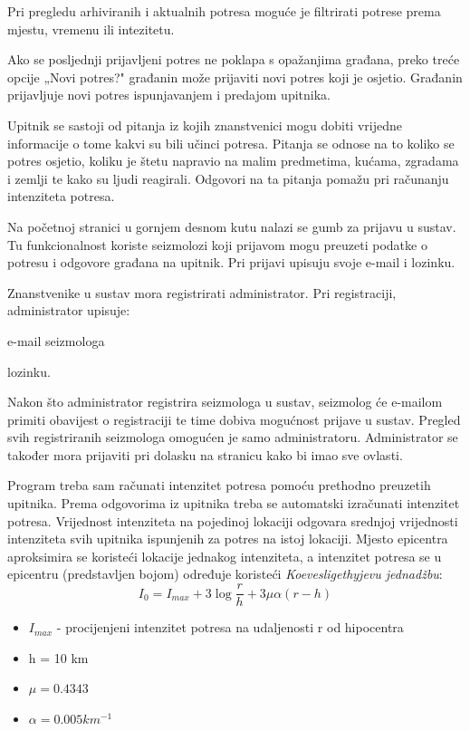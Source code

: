 {	Pri pregledu arhiviranih i aktualnih potresa moguće je filtrirati potrese prema mjestu, vremenu ili intezitetu. 
	
	Ako se posljednji prijavljeni potres ne poklapa s opažanjima građana, preko treće opcije „Novi potres?" građanin može prijaviti novi potres koji je osjetio. Građanin prijavljuje novi potres ispunjavanjem i predajom upitnika.
	
	Upitnik se sastoji od pitanja iz kojih znanstvenici mogu dobiti vrijedne informacije o tome kakvi su bili učinci potresa. 
	Pitanja se odnose na to koliko se potres osjetio, koliku je štetu napravio na malim predmetima, kućama, zgradama i zemlji te kako su ljudi reagirali. 
	Odgovori na ta pitanja pomažu pri računanju intenziteta potresa.
	
	Na početnoj stranici u gornjem desnom kutu nalazi se gumb za prijavu u sustav. Tu funkcionalnost koriste seizmolozi koji prijavom mogu preuzeti podatke o potresu i odgovore građana na upitnik.  Pri prijavi upisuju svoje e-mail i lozinku.
	 
	Znanstvenike u sustav mora registrirati administrator. Pri registraciji, administrator upisuje:
	\begin{packed_item}
		\item e-mail seizmologa
		\item lozinku.
	\end{packed_item}
	Nakon što administrator registrira seizmologa u sustav, seizmolog će e-mailom primiti obavijest o registraciji te time dobiva mogućnost prijave u sustav.
	Pregled svih registriranih seizmologa omogućen je samo administratoru.
	Administrator se također mora prijaviti pri dolasku na stranicu kako bi imao sve ovlasti. \\
	
	}
	
	Program treba sam računati intenzitet potresa pomoću prethodno preuzetih upitnika. Prema odgovorima iz upitnika treba se automatski izračunati intenzitet potresa. 
	Vrijednost intenziteta na pojedinoj lokaciji odgovara srednjoj vrijednosti intenziteta svih upitnika ispunjenih za potres na istoj lokaciji. Mjesto epicentra aproksimira se koristeći lokacije jednakog intenziteta, a intenzitet potresa se u epicentru (predstavljen bojom) određuje koristeći \textit{Koevesligethyjevu jednadžbu}:
\begin{equation}
  I_{0} = I_{max} + 3\log\frac{r}{h} + 3\mu\alpha(r-h)
\end{equation}

\begin{itemize}                                                             
    \item $I_{max}$ - procijenjeni intenzitet potresa na udaljenosti r od hipocentra
    \item h = 10 km 
    \item $\mu=0.4343$
    \item $\alpha=0.005 km^{-1}$
    
\end{itemize} 


